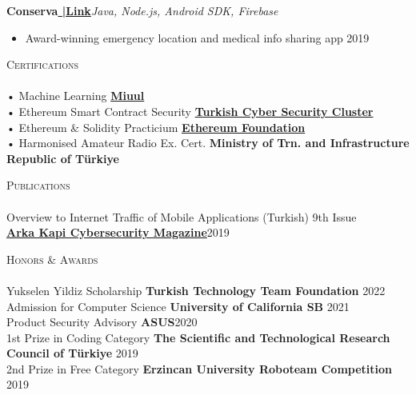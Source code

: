 \documentclass[a4paper]{article}
\newcommand{\lineunder} {
    \vspace*{-8pt} \\
    \hspace*{-18pt} \hrulefill \\
}
\newcommand{\header} [1] {
    {\hspace*{-18pt}\vspace*{6pt} \textsc{#1}}
    \vspace*{-6pt} \lineunder
}
\begin{document}
      {\textbf{Conserva}}\textbf{\href{https://github.com/goeksu/Conserva}{\scriptsize{ |Link}}}\hfill{\sl Java, Node.js, Android SDK, Firebase}\\
          \vspace{-3mm}
\begin{itemize} \itemsep -3pt
\item[] Award-winning emergency location and medical info sharing app \hfill{2019}\\
\end{itemize}
          \vspace*{3mm}

      \header{Certifications}
      \vspace{2mm}
      • Machine Learning \textbf{\href{https://www.miuul.com}{Miuul}}\\
\vspace*{1mm}
      • Ethereum Smart Contract Security \textbf{\href{https://siberkume.org.tr/Index}{Turkish Cyber Security Cluster}}\\
\vspace*{1mm}
      • Ethereum \& Solidity Practicium \textbf{\href{https://verified.sertifier.com/en/verify/85223213010096}{Ethereum Foundation}}\\
\vspace*{1mm}
      • Harmonised Amateur Radio Ex. Cert. \textbf{Ministry of Trn. and Infrastructure Republic of Türkiye}\\
\vspace*{1mm}
      \vspace{2mm}

       \header{Publications}
      \vspace{2mm}
      Overview to Internet Traffic of Mobile Applications (Turkish) \hfill 9th Issue\\ 
      \textbf{\href{https://arkakapimag.com}{Arka Kapi Cybersecurity Magazine}}\hfill2019\\
      

\vspace*{1mm}
      \vspace{2mm}

\header{Honors \& Awards}
      \vspace{2mm} 
      Yukselen Yildiz Scholarship \textbf{Turkish Technology Team Foundation} \hfill2022\\
\vspace*{1mm}
      Admission for Computer Science \textbf{University of California SB} \hfill2021\\
\vspace*{1mm}
      Product Security Advisory \textbf{ASUS}\hfill 2020\\
\vspace*{1mm}
      1st Prize in Coding Category \textbf{The Scientific and Technological Research Council of Türkiye} \hfill2019\\
\vspace*{1mm}
      2nd Prize in Free Category \textbf{Erzincan University Roboteam Competition} \hfill2019\\
\vspace*{1mm}

    \ 
    
\end{document}
